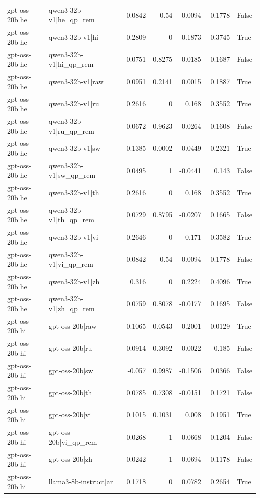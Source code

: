 \begin{table}
\begin{tabular}{l l r r r r l}
gpt-oss-20b|he & qwen3-32b-v1|he_qp_rem & 0.0842 & 0.54 & -0.0094 & 0.1778 & False \\
gpt-oss-20b|he & qwen3-32b-v1|hi & 0.2809 & 0 & 0.1873 & 0.3745 & True \\
gpt-oss-20b|he & qwen3-32b-v1|hi_qp_rem & 0.0751 & 0.8275 & -0.0185 & 0.1687 & False \\
gpt-oss-20b|he & qwen3-32b-v1|raw & 0.0951 & 0.2141 & 0.0015 & 0.1887 & True \\
gpt-oss-20b|he & qwen3-32b-v1|ru & 0.2616 & 0 & 0.168 & 0.3552 & True \\
gpt-oss-20b|he & qwen3-32b-v1|ru_qp_rem & 0.0672 & 0.9623 & -0.0264 & 0.1608 & False \\
gpt-oss-20b|he & qwen3-32b-v1|sw & 0.1385 & 0.0002 & 0.0449 & 0.2321 & True \\
gpt-oss-20b|he & qwen3-32b-v1|sw_qp_rem & 0.0495 & 1 & -0.0441 & 0.143 & False \\
gpt-oss-20b|he & qwen3-32b-v1|th & 0.2616 & 0 & 0.168 & 0.3552 & True \\
gpt-oss-20b|he & qwen3-32b-v1|th_qp_rem & 0.0729 & 0.8795 & -0.0207 & 0.1665 & False \\
gpt-oss-20b|he & qwen3-32b-v1|vi & 0.2646 & 0 & 0.171 & 0.3582 & True \\
gpt-oss-20b|he & qwen3-32b-v1|vi_qp_rem & 0.0842 & 0.54 & -0.0094 & 0.1778 & False \\
gpt-oss-20b|he & qwen3-32b-v1|zh & 0.316 & 0 & 0.2224 & 0.4096 & True \\
gpt-oss-20b|he & qwen3-32b-v1|zh_qp_rem & 0.0759 & 0.8078 & -0.0177 & 0.1695 & False \\
gpt-oss-20b|hi & gpt-oss-20b|raw & -0.1065 & 0.0543 & -0.2001 & -0.0129 & True \\
gpt-oss-20b|hi & gpt-oss-20b|ru & 0.0914 & 0.3092 & -0.0022 & 0.185 & False \\
gpt-oss-20b|hi & gpt-oss-20b|sw & -0.057 & 0.9987 & -0.1506 & 0.0366 & False \\
gpt-oss-20b|hi & gpt-oss-20b|th & 0.0785 & 0.7308 & -0.0151 & 0.1721 & False \\
gpt-oss-20b|hi & gpt-oss-20b|vi & 0.1015 & 0.1031 & 0.008 & 0.1951 & True \\
gpt-oss-20b|hi & gpt-oss-20b|vi_qp_rem & 0.0268 & 1 & -0.0668 & 0.1204 & False \\
gpt-oss-20b|hi & gpt-oss-20b|zh & 0.0242 & 1 & -0.0694 & 0.1178 & False \\
gpt-oss-20b|hi & llama3-8b-instruct|ar & 0.1718 & 0 & 0.0782 & 0.2654 & True \\

\end{tabular}
\end{table}
